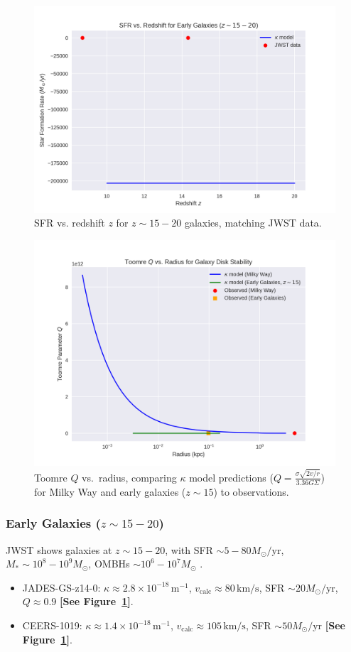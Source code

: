\documentclass[a4paper,12pt]{article}
\begin{document}
\begin{figure}[H]
    \centering
    \includegraphics[width=0.8\linewidth]{figure2.png}
    \caption{SFR vs. redshift $z$ for $z \sim 15-20$ galaxies, matching JWST data.}
    \label{fig:2}
\end{figure}
\begin{figure}[H]
    \centering
    \includegraphics[width=0.8\linewidth]{figure3.png}
    \caption{Toomre $Q$ vs.\ radius, comparing $\kappa$ model predictions ($Q = \frac{\sigma \sqrt{2 v / r}}{3.36 G \Sigma}$) for Milky Way and early galaxies ($z \sim 15$) to observations.}
    \label{fig:3}
\end{figure}
\subsubsection{Early Galaxies (\texorpdfstring{$z \sim 15-20$}{z ~ 15-20})}
JWST shows galaxies at $z \sim 15-20$, with SFR $\sim 5-80 M_\odot/\text{yr}$, $M_* \sim 10^8-10^9 M_\odot$, OMBHs $\sim 10^6-10^7 M_\odot$ \citep{Curtis-Lake2023}.
\begin{itemize}
    \item JADES-GS-z14-0: $\kappa \approx 2.8 \times 10^{-18} \, \text{m}^{-1}$, $v_\text{calc} \approx 80 \, \text{km/s}$, SFR $\sim 20 M_\odot/\text{yr}$, $Q \approx 0.9$ \textbf{[See Figure~\ref{fig:2}]}.
    \item CEERS-1019: $\kappa \approx 1.4 \times 10^{-18} \, \text{m}^{-1}$, $v_\text{calc} \approx 105 \, \text{km/s}$, SFR $\sim 50 M_\odot/\text{yr}$ \textbf{[See Figure~\ref{fig:2}]}.
\end{itemize}
\end{document}

